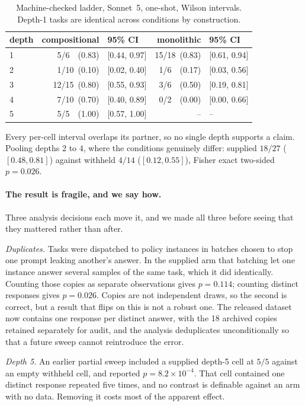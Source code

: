 \documentclass[10pt]{article}
\begin{document}
\begin{table}[h]\centering\small
\begin{tabular}{lrlrl}
\toprule
depth & compositional & 95\% CI & monolithic & 95\% CI \\
\midrule
1 & 5/6\ \ (0.83)  & [0.44, 0.97] & 15/18\ (0.83) & [0.61, 0.94] \\
2 & 1/10\ (0.10)   & [0.02, 0.40] & 1/6\ \ (0.17) & [0.03, 0.56] \\
3 & 12/15\ (0.80)  & [0.55, 0.93] & 3/6\ \ (0.50) & [0.19, 0.81] \\
4 & 7/10\ (0.70)   & [0.40, 0.89] & 0/2\ \ (0.00) & [0.00, 0.66] \\
5 & 5/5\ \ (1.00)  & [0.57, 1.00] & --             & -- \\
\bottomrule
\end{tabular}
\caption{Machine-checked ladder, Sonnet~5, one-shot, Wilson intervals. Depth-1 tasks are identical across conditions by construction.}
\label{tab:vsi}
\end{table}

Every per-cell interval overlaps its partner, so no single depth supports a
claim. Pooling depths $2$ to $4$, where the conditions genuinely differ:
supplied $18/27$ ($[0.48,0.81]$) against withheld $4/14$ ($[0.12,0.55]$), Fisher
exact two-sided $p=0.026$.

\paragraph{The result is fragile, and we say how.}
Three analysis decisions each move it, and we made all three before seeing that
they mattered rather than after.

\emph{Duplicates.} Tasks were dispatched to policy instances in batches chosen
to stop one prompt leaking another's answer. In the supplied arm that batching
let one instance answer several samples of the same task, which it did
identically. Counting those copies as separate observations gives $p=0.114$;
counting distinct responses gives $p=0.026$. Copies are not independent draws,
so the second is correct, but a result that flips on this is not a robust one.
The released dataset now contains one response per distinct answer, with the 18
archived copies retained separately for audit, and the analysis deduplicates
unconditionally so that a future sweep cannot reintroduce the error.

\emph{Depth 5.} An earlier partial sweep included a supplied depth-5 cell at
$5/5$ against an empty withheld cell, and reported $p=8.2\times10^{-4}$. That
cell contained one distinct response repeated five times, and no contrast is
definable against an arm with no data. Removing it costs most of the apparent
effect.
\end{document}
